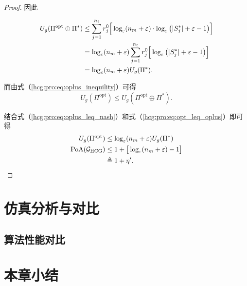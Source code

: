 \begin{proposition}
\begin{proof}
		因此
		
		\begin{align}
			\label{hcg:pro:eq:oplus_leq_nash}
			U_g(\Pi^{\text{opt}} \oplus \Pi^*) &\leq \sum_{j=1}^{n_t} r_j^0 \Big[\log_{\varepsilon}(n_m+\varepsilon) \cdot \log_{\varepsilon}\big(|S_j^*|+ \varepsilon - 1\big) \Big]\notag\\
			&= \log_{\varepsilon}(n_m+\varepsilon) \sum_{j=1}^{n_t} r_j^0 \Big[\log_{\varepsilon}\big(|S_j^*|+ \varepsilon - 1\big) \Big]\notag\\
			&= \log_{\varepsilon}(n_m+\varepsilon) U_g(\Pi^*).
		\end{align}
		
		而由式（\ref{hcg:pro:eq:oplus_inequility}）可得
		\begin{equation}
		\label{hcg:pro:eq:opt_leq_oplus}
			U_g(\Pi^{\text{opt}}) \leq U_g(\Pi^{\text{opt}} \oplus \Pi^*).
		\end{equation}
		
		结合式（\ref{hcg:pro:eq:oplus_leq_nash}）和式（\ref{hcg:pro:eq:opt_leq_oplus}）即可得
		\begin{align}
		\label{hcg:pro:eq:PoA_max}
			U_g(\Pi^{\text{opt}}) &\leq \log_{\varepsilon}(n_m+\varepsilon) U_g(\Pi^*)\\
			\mathrm{PoA}(\mathcal{G}_{\text{HCG}}) &\leq 1+ \big[\log_{\varepsilon}(n_m+\varepsilon) -1\big]\notag\\
			&\triangleq 1+\eta'.
		\end{align}
		
				
		\end{proof}
\end{proposition}


\section{仿真分析与对比}
\label{hg:sec:simulation}

\subsection{算法性能对比}
\label{simu:sub:conpare}

\section{本章小结}
\label{hg:sec:conclusion}




